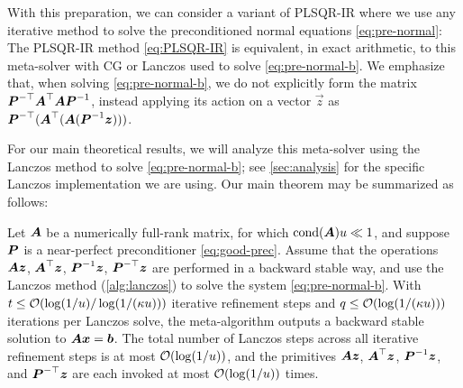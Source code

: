 \documentclass[onefignum,onetabnum,pagebackref,dvipsnames]{siamart220329}
\begin{document}
With this preparation, we can consider a variant of PLSQR-IR where we use any iterative method to solve the preconditioned normal equations \cref{eq:pre-normal}:
%
%
\noindent The PLSQR-IR method \cref{eq:PLSQR-IR} is equivalent, in exact arithmetic, to this meta-solver with CG or Lanczos used to solve \cref{eq:pre-normal-b}.
We emphasize that, when solving \cref{eq:pre-normal-b}, we do not explicitly form the matrix $\boldsymbol{P}^{-\top}\boldsymbol{A}^\top\boldsymbol{A}\boldsymbol{P}^{-1}$, instead applying its action on a vector $\vec{z}$ as $\boldsymbol{P}^{-\top}(\boldsymbol{A}^\top(\boldsymbol{A}(\boldsymbol{P}^{-1}\boldsymbol{z})))$.

For our main theoretical results, we will analyze this meta-solver using the Lanczos method to solve \cref{eq:pre-normal-b}; see \cref{sec:analysis} for the specific Lanczos implementation we are using.
Our main theorem may be summarized as follows:

\begin{inftheorem} \label{infthm:main}
    Let $\boldsymbol{A}$ be a numerically full-rank matrix, for which $\operatorname{cond}(\boldsymbol{A})u \ll 1$, and suppose $\boldsymbol{P}$ is a near-perfect preconditioner \cref{eq:good-prec}.
    Assume that the operations $\boldsymbol{A}\boldsymbol{z}$, $\boldsymbol{A}^\top\boldsymbol{z}$, $\boldsymbol{P}^{-1}\boldsymbol{z}$, $\boldsymbol{P}^{-\top}\boldsymbol{z}$ are performed in a backward stable way, and use the Lanczos method (\cref{alg:lanczos}) to solve the system \cref{eq:pre-normal-b}.
    With $t \le \mathcal{O}(\log(1/u) / \log(1/(\kappa u)))$ iterative refinement steps
    and $q \le \mathcal{O}(\log(1/(\kappa u)))$ iterations per Lanczos solve, the meta-algorithm outputs a backward stable solution to $\boldsymbol{A}\boldsymbol{x} = \boldsymbol{b}$.
    The total number of Lanczos steps across all iterative refinement steps is at most $\mathcal{O}(\log(1/u))$, and the primitives $\boldsymbol{A}\boldsymbol{z}$, $\boldsymbol{A}^\top \boldsymbol{z}$, $\boldsymbol{P}^{-1}\boldsymbol{z}$, and $\boldsymbol{P}^{-\top}\boldsymbol{z}$ are each invoked at most $\mathcal{O}(\log(1/u))$ times.
\end{inftheorem}
\end{document}
